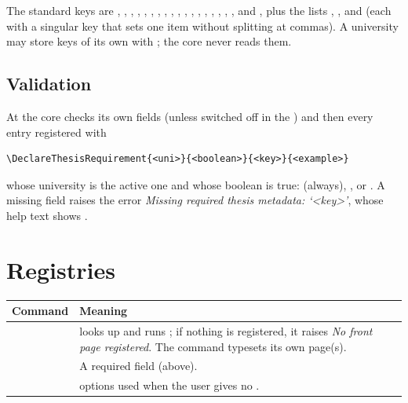 The standard keys are , , ,
, , , , ,
, , , ,
, , , ,
, ,  and , plus the
lists , ,  and
 (each with a singular key that sets one item without
splitting at commas). A university may store keys of its own with
; the core never reads them.

\subsection{Validation}

At  the core checks its own fields (unless
switched off in the ) and then every entry registered with

\begin{lstlisting}
\DeclareThesisRequirement{<uni>}{<boolean>}{<key>}{<example>}
\end{lstlisting}

whose university is the active one and whose  boolean is true:
 (always), ,
 or . A missing field raises the error
\emph{Missing required thesis metadata: `<key>'}, whose help text shows
.

\section{Registries}

\begin{tabularx}{\textwidth}{@{}L{6.2cm} Y@{}}
\toprule
\textbf{Command} & \textbf{Meaning} \\
\midrule
{}\newline{} &  looks up  and runs ; if nothing is registered, it raises \emph{No front page registered}. The command typesets its own page(s). \\
\newline{} & A required field (above). \\
\newline{} &  options used when the user gives no . \\
\bottomrule
\end{tabularx}

